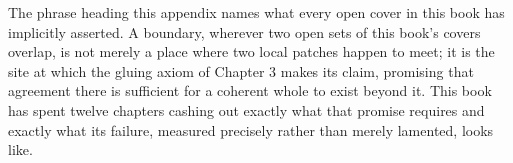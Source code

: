 The phrase heading this appendix names what every open cover in this book has implicitly asserted. A boundary, wherever two open sets of this book's covers overlap, is not merely a place where two local patches happen to meet; it is the site at which the gluing axiom of Chapter 3 makes its claim, promising that agreement there is sufficient for a coherent whole to exist beyond it. This book has spent twelve chapters cashing out exactly what that promise requires and exactly what its failure, measured precisely rather than merely lamented, looks like.
